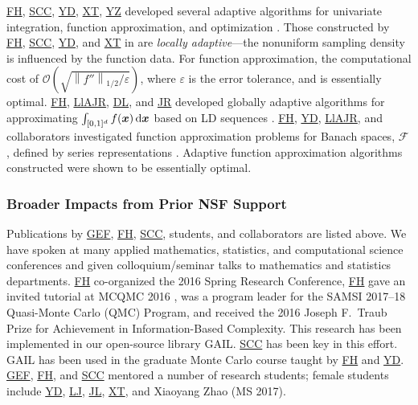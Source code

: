\documentclass[11pt]{NSFamsart}
\newcommand{\FH}{\hyperlink{FHlink}{FH}\xspace}
\newcommand{\SCTC}{\hyperlink{SCTClink}{SCC}\xspace}
\newcommand{\GEF}{\hyperlink{GEFlink}{GEF}\xspace}
\newcommand{\YD}{\hyperlink{YDlink}{YD}\xspace}
\newcommand{\JR}{\hyperlink{JRlink}{JR}\xspace}
\newcommand{\LlAJR}{\hyperlink{LlAJRlink}{LlAJR}\xspace}
\newcommand{\LJ}{\hyperlink{LJlink}{LJ}\xspace}
\newcommand{\XT}{\hyperlink{XTlink}{XT}\xspace}
\newcommand{\DL}{\hyperlink{DLlink}{DL}\xspace}
\newcommand{\JL}{\hyperlink{JLlink}{JL}\xspace}
\newcommand{\YZ}{\hyperlink{YZlink}{YZ}\xspace}
\newcommand{\GAIL}{GAIL\xspace}
\newcommand{\bx}{{\boldsymbol{x}}}
\def\dif{\textup{d}}
\newcommand{\calf}{{\mathcal{F}}}
\newcommand{\norm}[2][{}]{\ensuremath{\left \lVert #2 \right \rVert}_{#1}}
\newcommand{\Order}{\mathcal{O}}
\begin{document}
\FH, \SCTC, \YD, \XT, \YZ developed several adaptive algorithms for univariate integration, function approximation, and optimization \cite{ChoEtal17a,HicEtal14b,  Din15a, Ton14a, Zha18a}.  Those constructed by \FH, \SCTC, \YD, and \XT in \cite{ChoEtal17a} are \emph{locally adaptive}---the nonuniform sampling density is influenced by the function data.  For function approximation, the computational cost of $\Order\left(\sqrt{\norm[1/2]{f''}/\varepsilon} \right)$, where $\varepsilon$ is the error tolerance, and is essentially optimal. 
\FH, \LlAJR, \DL, and \JR developed globally adaptive algorithms for approximating $\int_{[0,1]^d} f(\bx) \, \dif \bx$ based on LD sequences \cite{HicJim16a,HicEtal17a,JimHic16a}. 
\FH, \YD, \LlAJR, and collaborators investigated function approximation problems for Banach spaces, $\calf$, defined by series representations \cite{DinHic20a,DinEtal20a}.  Adaptive function approximation algorithms constructed were shown to be essentially optimal.


\subsubsection{Broader Impacts from Prior NSF Support} \label{prevBIsect}
Publications by \GEF, \FH,  \SCTC, students, and collaborators are listed above.  We have spoken at many applied mathematics, statistics,
and computational science conferences and given colloquium/seminar talks to mathematics and
statistics departments.  \FH co-organized the
2016 Spring Research
Conference, \FH gave an invited tutorial
at MCQMC 2016
\cite{Hic17a}, was a program leader for the SAMSI 2017--18 Quasi-Monte Carlo (QMC) Program, and received the 2016 Joseph F.\ Traub Prize for Achievement in Information-Based Complexity.  This research has been implemented in our open-source library
\GAIL \cite{ChoEtal21a}.  \SCTC has been key in this effort.  \GAIL has been used in the graduate Monte Carlo course taught by \FH and \YD. \GEF, \FH, and \SCTC mentored a number of
research students;  female students include \YD, \LJ, \JL, \XT, and Xiaoyang Zhao (MS 2017).
\end{document}
